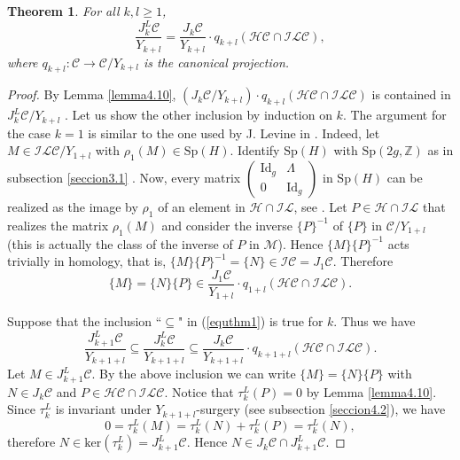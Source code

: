 \documentclass[10pt]{amsart}
\numberwithin{equation}{section}
\numberwithin{equation}{section}
\newtheorem{theorem}{Theorem}[section]
\theoremstyle{definition}
\begin{document}
\begin{theorem}\label{teorema1} For all $k,l\geq 1$,
\begin{equation}\label{equthm1}
\frac{J_k^L\mathcal{C}}{Y_{k+l}}=\frac{J_k\mathcal{C}}{Y_{k+l}}\cdot q_{k+l}\left(\mathcal{HC}\cap \mathcal{ILC}\right),
\end{equation}
where $q_{k+l}:\mathcal{C}\rightarrow\mathcal{C}/Y_{k+l}$ is the canonical projection.
\end{theorem}
\begin{proof}
By  Lemma \ref{lemma4.10}, $\left(J_k\mathcal{C}/Y_{k+l}\right)\cdot q_{k+l}\left(\mathcal{HC}\cap \mathcal{ILC}\right)$ is contained in $J_k^L\mathcal{C}/Y_{k+l}$  . Let us show the other inclusion by induction on $k$.
The argument for the case  $k=1$ is similar to the one used by J. Levine in \cite[Proposition 6.1]{MR2265877}. Indeed, let $M\in \mathcal{ILC}/Y_{1+l}$ with $\rho_1(M)\in\text{Sp}(H)$.  Identify $\text{Sp}(H)$ with $\text{Sp}(2g,\mathbb{Z})$ as in subsection \ref{seccion3.1} . Now, every matrix $\left( \begin{smallmatrix} \text{Id}_g & \Lambda\\ 0 & \text{Id}_g \end{smallmatrix} \right)$ in $\text{Sp}(H)$ can be realized as the image by $\rho_1$ of an element in $\mathcal{H}\cap\mathcal{IL}$, see  \cite[Lemma 6.3]{MR2265877}. Let $P\in \mathcal{H}\cap\mathcal{IL}$  that  realizes the matrix  $\rho_1(M)$ and  consider the inverse $\{P\}^{-1}$ of $\{P\}$ in $\mathcal{C}/Y_{1+l}$ (this is actually the class of  the inverse of $P$  in $\mathcal{M}$). Hence $\{M\}\{P\}^{-1}$ acts trivially in homology, that is, $\{M\}\{P\}^{-1}=\{N\}\in\mathcal{IC}=J_1\mathcal{C}$. Therefore 
$$\{M\}=\{N\}\{P\}\in \frac{J_1\mathcal{C}}{Y_{1+l}}\cdot q_{1+l}\left(\mathcal{HC}\cap \mathcal{ILC}\right).$$ 

\noindent Suppose that the inclusion ``$\subseteq$" in (\ref{equthm1})  is true for $k$. Thus we have 
\begin{equation}\label{ecuacion4.11}%
\frac{J_{k+1}^L\mathcal{C}}{Y_{k+1+l}}\subseteq \frac{J_k^L\mathcal{C}}{Y_{k+1+l}}\subseteq \frac{J_k\mathcal{C}}{Y_{k+1+l}}\cdot q_{k+1+l}\left(\mathcal{HC}\cap \mathcal{ILC}\right).
\end{equation}
Let $M\in J_{k+1}^L\mathcal{C}$. By  the above inclusion we can write $\{M\}=\{N\}\{P\}$ with $N\in J_k\mathcal{C}$ and $P\in \mathcal{HC}\cap\mathcal{ILC}$. Notice that $\tau_k^L(P)=0$ by Lemma \ref{lemma4.10}. Since $\tau_k^L$ is invariant under $Y_{k+1+l}$-surgery (see  subsection \ref{seccion4.2}), we have 
 $$0=\tau_k^L(M)=\tau_k^L(N)+\tau_k^L(P)=\tau_k^L(N),$$
 therefore $N\in \text{ker}(\tau_k^L)=J_{k+1}^L\mathcal{C}$. Hence $N\in J_k\mathcal{C}\cap J_{k+1}^L\mathcal{C}$.


\end{proof}
\end{document}

